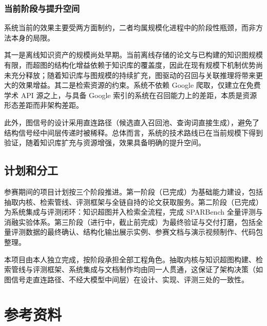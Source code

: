 \documentclass[12pt,a4paper]{ctexart}
\begin{document}
\subsubsection{当前阶段与提升空间}

系统当前的效果主要受两方面制约，二者均属规模化进程中的阶段性瓶颈，而非方法本身的局限。

其一是离线知识资产的规模尚处早期。当前离线存储的论文与已构建的知识图规模有限，而超图的结构化增益依赖于知识库的覆盖度，因此在现有规模下机制优势尚未充分释放；随着知识库与图规模的持续扩充，图驱动的召回与关联推理将带来更大的效果增益。其二是检索资源的约束。系统不依赖 Google 爬取，仅建立在免费学术 API 源之上，与具备 Google 索引的系统在召回能力上的差距，本质是资源形态差距而非架构差距。

此外，图信号的设计采用直连路径（候选直入召回池、查询词直接生成），避免了结构信号经中间层传递时被稀释。总体而言，系统的技术路线已在当前规模下得到验证，随着知识库扩充与资源增强，效果具备明确的提升空间。

\subsection{计划和分工}

参赛期间的项目计划按三个阶段推进。第一阶段（已完成）为基础能力建设，包括抽取内核、检索管线、评测框架与全链自持的论文获取服务。第二阶段（已完成）为系统集成与评测闭环：知识超图并入检索全流程，完成 SPARBench 全量评测与消融实验体系。第三阶段（进行中，截止前完成）为最终验证与交付打磨，包括全量评测数据的最终确认、结构化输出展示实例、参赛文档与演示视频制作、代码包整理。

本项目由本人独立完成，按阶段承担全部工程角色。抽取内核与知识超图构建、检索管线与评测框架、系统集成与文档制作均由同一人贯通，这保证了架构决策（如图信号走直连路径、不经大模型中间层）在设计、实现、评测三处的一致性。

\section*{\centering 参考资料}
\end{document}
